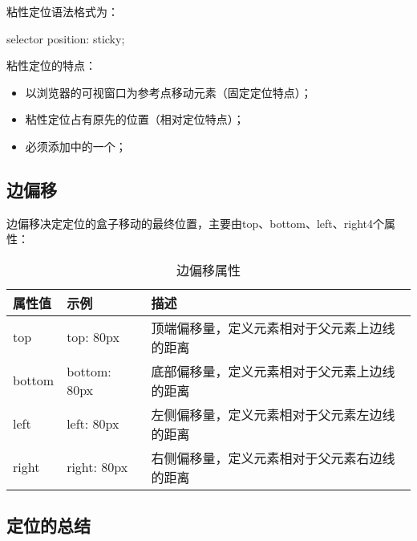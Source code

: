 粘性定位语法格式为：
\begin{css}
    selector {
    position: sticky;
    }
\end{css}
粘性定位的特点：
\begin{itemize}
    \item 以浏览器的可视窗口为参考点移动元素（固定定位特点）；
    \item 粘性定位占有原先的位置（相对定位特点）；
    \item 必须添加中的一个；
\end{itemize}

\subsection{边偏移\label{edgeOffset}}
边偏移决定定位的盒子移动的最终位置，主要由top、bottom、left、right4个属性：
\begin{table}[H]
    \centering
    \caption{边偏移属性}
    \label{edgeOffsetTable}
    \begin{tabular}{lll}
        \hline
        属性值    & 示例           & 描述                     \\
        \hline
        top    & top: 80px    & 顶端偏移量，定义元素相对于父元素上边线的距离 \\
        bottom & bottom: 80px & 底部偏移量，定义元素相对于父元素上边线的距离 \\
        left   & left: 80px   & 左侧偏移量，定义元素相对于父元素左边线的距离 \\
        right  & right: 80px  & 右侧偏移量，定义元素相对于父元素右边线的距离 \\
        \hline
    \end{tabular}
\end{table}
\subsection{定位的总结}
